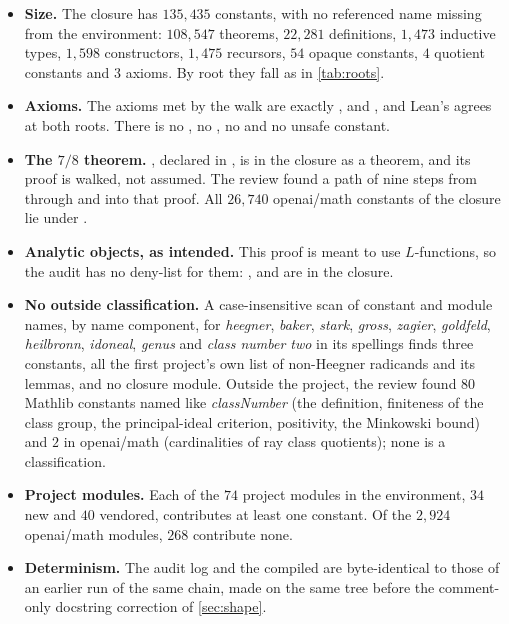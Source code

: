\documentclass[11pt]{article}
\theoremstyle{definition}
\begin{document}
{\begin{itemize}[nosep]
\item \textbf{Size.} The closure has $135{,}435$ constants, with no referenced name missing from the environment: $108{,}547$ theorems, $22{,}281$ definitions, $1{,}473$ inductive types, $1{,}598$ constructors, $1{,}475$ recursors, $54$ opaque constants, $4$ quotient constants and $3$ axioms. By root they fall as in \cref{tab:roots}.
\item \textbf{Axioms.} The axioms met by the walk are exactly ,  and , and Lean's  agrees at both roots. There is no , no , no  and no unsafe constant.
\item \textbf{The $7/8$ theorem.} , declared in , is in the closure as a theorem, and its proof is walked, not assumed. The review found a path of nine steps from  through  and  into that proof. All $26{,}740$ openai/math constants of the closure lie under .
\item \textbf{Analytic objects, as intended.} This proof is meant to use $L$-functions, so the audit has no deny-list for them: ,  and  are in the closure.
\item \textbf{No outside classification.} A case-insensitive scan of constant and module names, by name component, for \emph{heegner}, \emph{baker}, \emph{stark}, \emph{gross}, \emph{zagier}, \emph{goldfeld}, \emph{heilbronn}, \emph{idoneal}, \emph{genus} and \emph{class number two} in its spellings finds three constants, all the first project's own list  of non-Heegner radicands and its lemmas, and no closure module. Outside the project, the review found $80$ Mathlib constants named like \emph{classNumber} (the definition, finiteness of the class group, the principal-ideal criterion, positivity, the Minkowski bound) and $2$ in openai/math (cardinalities of ray class quotients); none is a classification.
\item \textbf{Project modules.} Each of the $74$ project modules in the environment, $34$ new and $40$ vendored, contributes at least one constant. Of the $2{,}924$ openai/math modules, $268$ contribute none.
\item \textbf{Determinism.} The audit log and the compiled  are byte-identical to those of an earlier run of the same chain, made on the same tree before the comment-only docstring correction of \cref{sec:shape}.
\end{itemize}

}
\end{document}
